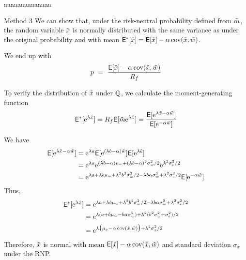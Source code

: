 aaaaaaaaaaaaaa\documentclass[xcolor=dvipsnames,10pt]{beamer}
\begin{document}
\begin{frame}{Method 3}
We can show that, under the risk-neutral probability defined from $\tilde{m}$, the random variable $\tilde{x}$ is normally distributed with the same variance as under the original probability and with mean $\mathsf{E}^*[\tilde{x}] = \mathsf{E}[\tilde{x}] - \alpha \operatorname{cov}(\tilde{x},\tilde{w})$.

We end up with
$$p \ = \ \frac{\mathsf{E}[\tilde{x}] - \alpha \operatorname{cov}(\tilde{x},\tilde{w})}{R_f}$$

To verify the distribution of $\tilde{x}$ under $\mathbb{Q}$, we calculate the moment-generating function
$$\mathsf{E}^*[\mathrm{e}^{\lambda \tilde{x}}] = R_f \mathsf{E}[\tilde{m} \mathrm{e}^{\lambda \tilde{x}}] = \frac{\mathsf{E}[\mathrm{e}^{\lambda \tilde{x} -\alpha \tilde{w}}]}{\mathsf{E}[\mathrm{e}^{-\alpha \tilde{w}}]}$$
\end{frame}

\begin{frame}[plain]
    We have
 \begin{align*}
     \mathsf{E}[\mathrm{e}^{\lambda \tilde{x} -\alpha \tilde{w}}] &= \mathrm{e}^{\lambda a}\mathsf{E}[\mathrm{e}^{(\lambda b-\alpha)\tilde{w}}]\mathsf{E}[\mathrm{e}^{\lambda \tilde{e}}]\\
     &= \mathrm{e}^{\lambda a}\mathrm{e}^{(\lambda b-\alpha)\mu_w + (\lambda b-\alpha)^2\sigma_w^2/2}\mathrm{e}^{\lambda^2\sigma^2_e/2}\\
     &= \mathrm{e}^{\lambda a+\lambda b\mu_w +\lambda^2b^2\sigma_w^2/2 - \lambda b \alpha \sigma_w^2 + \lambda^2\sigma_e^2/2}\mathsf{E}[\mathrm{e}^{-\alpha \tilde{w}}]
 \end{align*} 
 Thus,
 \begin{align*}
     \mathsf{E}^*[\mathrm{e}^{\lambda \tilde{x}}] & = \mathrm{e}^{\lambda a+\lambda b\mu_w +\lambda^2b^2\sigma_w^2/2 - \lambda b \alpha \sigma_w^2 + \lambda^2\sigma_e^2/2}\\
     &= \mathrm{e}^{\lambda (a + b \mu_w - b \alpha \sigma_w^2) + \lambda^2(b^2\sigma_w^2 + \sigma_e^2)/2}\\
     &= \mathrm{e}^{\lambda \big(\mu_x - \alpha \operatorname{cov}(\tilde{x},\tilde{w})\big) + \lambda^2\sigma_x^2/2}
     \end{align*}
Therefore, $\tilde{x}$ is normal with mean $\mathsf{E}[\tilde{x}] - \alpha \operatorname{cov}(\tilde{x},\tilde{w})$ and standard deviation $\sigma_x$ under the RNP.
\end{frame}
\end{document}
